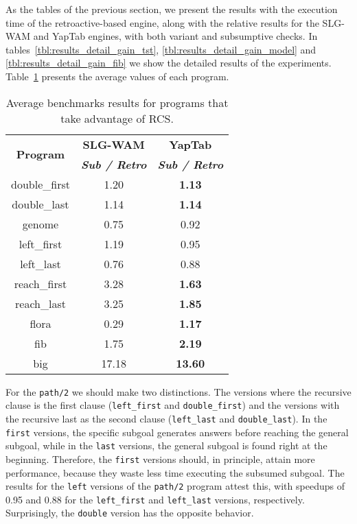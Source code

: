 As the tables of the previous section, we present the results with the execution time of the retroactive-based
engine, along with the relative results for the SLG-WAM and YapTab engines, with both variant and subsumptive checks.
In tables~\ref{tbl:results_detail_gain_tst}, \ref{tbl:results_detail_gain_model} and \ref{tbl:results_detail_gain_fib}
we show the detailed results of the experiments. Table~\ref{tbl:results_gain_overview} presents the average values of
each program.

\begin{table}[ht]
\centering
  \begin{tabular}{ccc}
   \hline
    \hline
    \multirow{2}{*}{\textbf{Program}} & \textbf{SLG-WAM} & \textbf{YapTab} \\
    & \textbf{\textit{\small{Sub / Retro}}} & \textbf{\textit{\small{Sub / Retro}}} \\
   \hline
   \hline
double\_first & 1.20 & \textbf{1.13} \\
double\_last & 1.14 & \textbf{1.14} \\
genome & 0.75 & 0.92 \\
left\_first & 1.19 & 0.95 \\
left\_last & 0.76  & 0.88 \\
reach\_first  & 3.28 & \textbf{1.63} \\
reach\_last  & 3.25 & \textbf{1.85} \\
flora & 0.29 & \textbf{1.17} \\
fib & 1.75 & \textbf{2.19} \\
big & 17.18 & \textbf{13.60} \\
\hline
\hline
\end{tabular}
\caption{Average benchmarks results for programs that take advantage of RCS.}
\label{tbl:results_gain_overview}
\end{table}

For the \texttt{path/2} we should make two distinctions. The versions where the recursive clause is the first
clause (\texttt{left\_first} and \texttt{double\_first}) and the versions with the recursive last as the second
clause (\texttt{left\_last} and \texttt{double\_last}). In the \texttt{first} versions, the specific subgoal
generates answers before reaching the general subgoal, while in the \texttt{last} versions, the general subgoal
is found right at the beginning. Therefore, the \texttt{first} versions should, in principle, attain more performance,
because they waste less time executing the subsumed subgoal. The results for the \texttt{left} versions of the
\texttt{path/2} program attest this, with speedups of 0.95 and 0.88 for the \texttt{left\_first} and
\texttt{left\_last} versions, respectively. Surprisingly, the \texttt{double} version has the opposite behavior.

